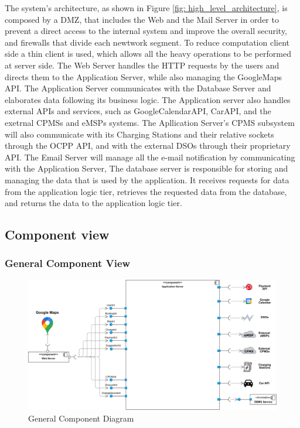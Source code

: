 \documentclass[table, 12pt]{article}
\begin{document}
The system's architecture, as shown in Figure \ref{fig: high_level_architecture}, is composed by a DMZ, that includes the Web and the Mail Server in order to prevent a direct access to the internal system and improve the overall security, and firewalls that divide each newtwork segment.
To reduce computation client side a thin client is used, which allows all the heavy operations to be performed at server side. The Web Server handles the HTTP requests by the users and directs them to the Application Server, while also managing the GoogleMaps API. 
The Application Server communicates with the Database Server and elaborates data following its business logic. The Application server also handles external APIs and services, such as GoogleCalendarAPI, CarAPI, and the exetrnal CPMSs and eMSPs systems.
The Apllication Server's CPMS subsystem will also communicate with its Charging Stations and their relative sockets through the OCPP API, and with the external DSOs through their proprietary API.
The Email Server will manage all the e-mail notification by communicating with the Application Server, The database server is responsible for storing and managing the data that is used by the application. It receives requests for data from the application logic tier, retrieves the requested data from the database, and returns the data to the application logic tier.

\subsection{Component view}
\subsubsection*{General Component View}
\begin{center}
    \begin{figure}[H]
        \includegraphics[scale=0.65, center]{assets/general_component_diagram.png}
        \caption{General Component Diagram}
        \label{fig: general_component_view}
    \end{figure}
\end{center}
\end{document}
